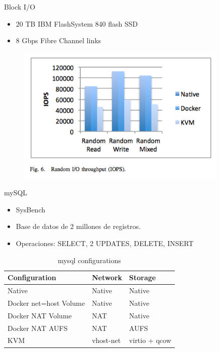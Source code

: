 \documentclass[compress]{beamer}
\begin{document}
\begin{frame}{Block I/O}
	\begin{itemize}
		\item 20 TB IBM FlashSystem 840 flash SSD
		\item 8 Gbps Fibre Channel links
	\end{itemize}
\begin{figure}[H]
  \centering
  \includegraphics[width=0.9\textwidth]{images/block2}
    \label{fig:dynamic}
\end{figure}	
\end{frame}


\begin{frame}{mySQL}
\begin{itemize}
	\item SysBench
	\item Base de datos de 2 millones de registros.
	\item Operaciones: SELECT, 2 UPDATES, DELETE, INSERT
\end{itemize}

\begin{table}[h]
\centering
\begin{tabular}{|l|l|l|}
\hline
Configuration & Network & Storage \\ \hline
Native & Native & Native \\ \hline
Docker net=host Volume & Native & Native \\ \hline
Docker NAT Volume & NAT & Native \\ \hline
Docker NAT AUFS & NAT & AUFS \\ \hline
KVM & vhost-net & virtio + qcow \\ \hline
\end{tabular}
\caption{mysql configurations}
\label{my-label}
\end{table}


\end{frame}
\end{document}
